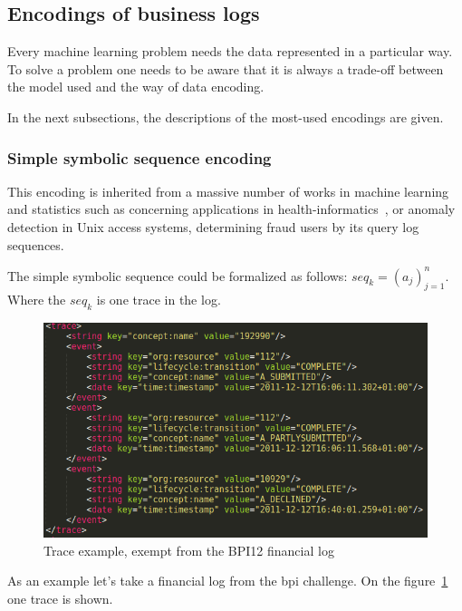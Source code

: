 \subsection{Encodings of business logs}

Every machine learning problem needs the data represented in a particular way. To solve a problem one needs to be aware that it is always a trade-off between the model used and the way of data encoding. 

In the next subsections, the descriptions of the most-used encodings are given.


\subsubsection{Simple symbolic sequence encoding}

This encoding is inherited from a massive number of works in machine learning and statistics such as concerning applications in health-informatics~\cite{Xing:2010:BSS:1882471.1882478}, or anomaly detection in Unix access systems, determining fraud users by its query log sequences. 

The simple symbolic sequence could be formalized as follows: $seq_{k} = (a_j)_{j=1}^{n}$.
Where the $seq_{k}$ is one trace in the log.


\begin{figure}[!ht]
	\begin{center}  
		\includegraphics[width=\textwidth]{5_log_example_fin.png}
		\caption{Trace example, exempt from the BPI12 financial log~\cite{bpichallenge2012}}
		\label{figure:trace-example-2}	
	\end{center}
\end{figure}


As an example let's take a financial log from the bpi challenge. On the figure~\ref{figure:trace-example-2} one trace is shown.

